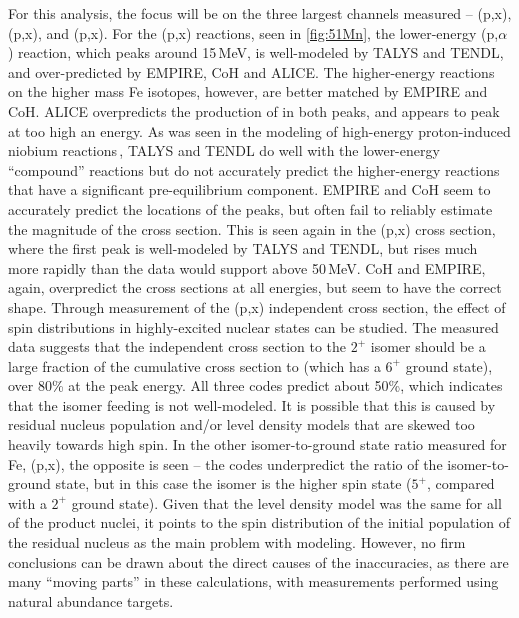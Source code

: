 For this analysis, the focus will be on the three largest channels  measured -- (p,x), (p,x), and (p,x).
For the (p,x) reactions, seen in \autoref{fig:51Mn}, the lower-energy  (p,$\alpha$) reaction, which peaks around 15\,MeV, is  well-modeled by TALYS and TENDL, and over-predicted by EMPIRE, CoH and ALICE.
The higher-energy reactions on the higher mass Fe isotopes, however, are better matched by  EMPIRE and CoH.
ALICE overpredicts the production of  in both peaks, and appears to peak at too high an energy.
As was seen in the modeling of high-energy proton-induced niobium reactions\,\cite{Voyles2018a}, TALYS and TENDL do well with the lower-energy \enquote{compound} reactions but do not accurately predict the higher-energy reactions that have a significant pre-equilibrium component.
EMPIRE and CoH seem to accurately predict the locations of the peaks, but often fail to reliably estimate the magnitude of the cross section.
This is seen again in the  (p,x) cross section, where the first peak is well-modeled by TALYS and TENDL, but  rises much more rapidly than the data would support above 50\,MeV.
CoH and EMPIRE, again, overpredict the cross sections at all energies, but seem to have the correct shape.
Through measurement of the  (p,x) independent cross section, the effect of spin distributions in highly-excited nuclear states can be studied.
The measured data suggests that the independent cross section to the $2^+$ isomer should be a large fraction of the cumulative cross section to  (which has a $6^+$ ground state), over 80\% at the peak energy.
All three codes predict about 50\%, which indicates that the isomer feeding is not well-modeled.
It is possible that this is caused by residual nucleus population and/or level density models that are skewed too heavily towards high spin.
In the other isomer-to-ground state ratio measured for Fe,  (p,x), the opposite is seen -- the codes underpredict the ratio of the isomer-to-ground state, but in this case the isomer is the higher spin state ($5^+$, compared with a  $2^+$ ground state).
Given that the level density model was the same for all of the product nuclei, it points to the spin distribution of the initial population of the residual nucleus as the main problem with modeling.
However, no firm conclusions can be drawn about the direct causes of the inaccuracies, as there are many \enquote{moving parts} in these calculations, with measurements performed using natural abundance targets.


